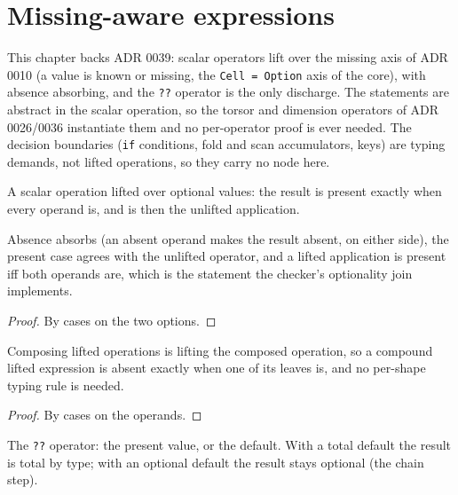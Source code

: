 \chapter{Missing-aware expressions}

This chapter backs ADR 0039: scalar operators lift over the missing
axis of ADR 0010 (a value is known or missing, the \texttt{Cell =
Option} axis of the core), with absence absorbing, and the \texttt{??}
operator is the only discharge.  The statements are abstract in the
scalar operation, so the torsor and dimension operators of ADR
0026/0036 instantiate them and no per-operator proof is ever needed.
The decision boundaries (\texttt{if} conditions, fold and scan
accumulators, keys) are typing demands, not lifted operations, so they
carry no node here.

\begin{definition}
  \label{def:lifted-operators}
  \leanok
  A scalar operation lifted over optional values: the result is present
  exactly when every operand is, and is then the unlifted application.
\end{definition}

\begin{theorem}
  \label{thm:lifting-laws}
  \leanok
  Absence absorbs (an absent operand makes the result absent, on either
  side), the present case agrees with the unlifted operator, and a
  lifted application is present iff both operands are, which is the
  statement the checker's optionality join implements.
\end{theorem}
\begin{proof}\leanok
  By cases on the two options.
\end{proof}

\begin{theorem}
  \label{thm:lifting-composes}
  \leanok
  Composing lifted operations is lifting the composed operation, so a
  compound lifted expression is absent exactly when one of its leaves
  is, and no per-shape typing rule is needed.
\end{theorem}
\begin{proof}\leanok
  By cases on the operands.
\end{proof}

\begin{definition}[Discharge]
  \label{def:coalesce}
  \leanok
  The \texttt{??} operator: the present value, or the default.  With a
  total default the result is total by type; with an optional default
  the result stays optional (the chain step).
\end{definition}


